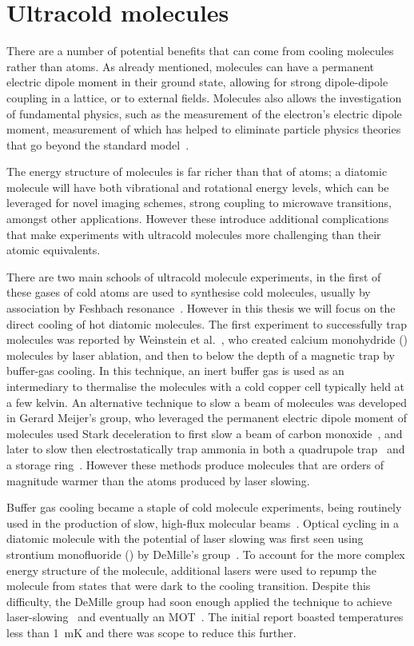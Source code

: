 \section{Ultracold molecules}

There are a number of potential benefits that can come from cooling molecules
rather than atoms. As already mentioned, molecules can have a permanent
electric dipole moment in their ground state, allowing for strong dipole-dipole
coupling in a lattice, or to external fields.
%
Molecules also allows the investigation of fundamental physics, such as the
measurement of the electron's electric dipole moment, measurement of
which has helped to eliminate particle physics theories that go beyond the
standard model~\cite{ACMEreview}.

The energy structure of molecules is far richer than that of atoms; a diatomic
molecule will have both vibrational and rotational energy levels, which can be
leveraged for novel imaging schemes, strong coupling to microwave transitions,
amongst other applications. However these introduce additional complications
that make experiments with ultracold molecules more challenging than their
atomic equivalents.

There are two main schools of ultracold molecule experiments, in the first of
these gases of cold atoms are used to synthesise cold molecules, usually by
association by Feshbach resonance~\cite{PhysRevA.89.033604}. However
in this thesis we will focus on the direct cooling of hot diatomic molecules.
The first experiment to successfully trap molecules was reported by Weinstein
et al.~\cite{Weinstein1998}, who created calcium monohydride (\CaH{}) molecules
by laser ablation, and then to below the depth of a magnetic trap by buffer-gas
cooling. In this technique, an inert buffer gas is used as an intermediary to
thermalise the molecules with a cold copper cell typically held at a few
kelvin.
%
An alternative technique to slow a beam of molecules was developed in Gerard
Meijer's group, who leveraged the permanent electric dipole moment of molecules
used Stark deceleration to first slow a beam of carbon
monoxide~\cite{Bethlem1999}, and later to slow then electrostatically trap
ammonia in both a quadrupole trap~\cite{Bethlem2000} and a storage
ring~\cite{Crompvoets2001, Crompvoets2005}. However these methods produce
molecules that are orders of magnitude warmer than the atoms produced by laser
slowing.

Buffer gas cooling became a staple of cold molecule experiments, being
routinely used in the production of slow, high-flux molecular
beams~\cite{Maxwell2005, Patterson2007, Barry2011}.  Optical cycling in a
diatomic molecule with the potential of laser slowing was first seen using
strontium monofluoride (\SrF{}) by DeMille's group~\cite{Shuman2009}. To
account for the more complex energy structure of the molecule, additional
lasers were used to repump the molecule from states that were dark to the
cooling transition.  Despite this difficulty, the DeMille group had soon enough
applied the technique to achieve laser-slowing~\cite{PhysRevLett.108.103002}
and eventually an \SrF{} MOT~\cite{Barry2014, PhysRevLett.116.063004}. The
initial report boasted temperatures less than \SI{1}{\milli\kelvin} and there
was scope to reduce this further.

